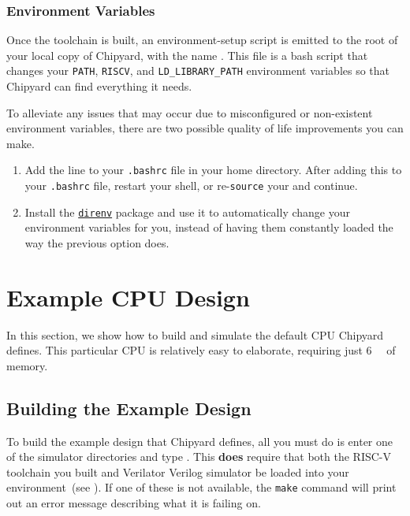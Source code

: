 \subsubsection{Environment Variables}\label{sec:Environment_Variables}
Once the toolchain is built, an environment-setup script is emitted to the root of your local copy of Chipyard, with the name .
This file is a bash script that changes your \texttt{PATH}, \texttt{RISCV}, and \texttt{LD\_LIBRARY\_PATH} environment variables so that Chipyard can find everything it needs.

To alleviate any issues that may occur due to misconfigured or non-existent environment variables, there are two possible quality of life improvements you can make.
\begin{enumerate}
\item Add the line  to your \texttt{.bashrc} file in your home directory.
  After adding this to your \texttt{.bashrc} file, restart your shell, or re-\texttt{source} your  and continue.
\item Install the \href{https://direnv.net/}{\texttt{direnv}} package and use it to automatically change your environment variables for you, instead of having them constantly loaded the way the previous option does.
\end{enumerate}

\section{Example CPU Design}\label{sec:Example_CPU_Design}
In this section, we show how to build and simulate the default CPU Chipyard defines.
This particular CPU is relatively easy to elaborate, requiring just \SI{6}{\giga\byte} of memory.

\subsection{Building the Example Design}\label{sec:Building_Example_Design}
To build the example design that Chipyard defines, all you must do is enter one of the simulator directories and type .
This \textbf{does} require that both the RISC-V toolchain you built and Verilator Verilog simulator be loaded into your environment~(see ).
If one of these is not available, the \texttt{make} command will print out an error message describing what it is failing on.

